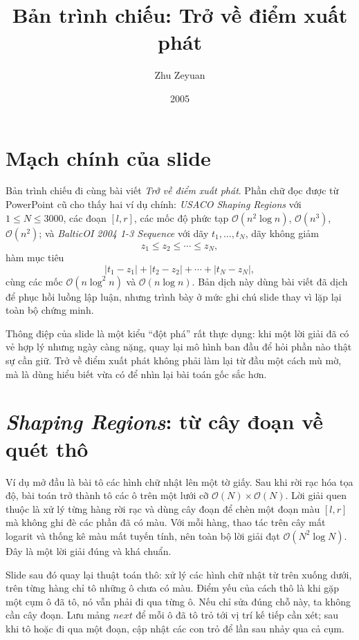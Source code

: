 \documentclass[11pt]{article}
\title{Bản trình chiếu: Trở về điểm xuất phát}
\author{Zhu Zeyuan}
\date{2005}
\newcommand{\Oh}{\mathcal{O}}
\begin{document}
\maketitle


\section{Mạch chính của slide}

Bản trình chiếu đi cùng bài viết \emph{Trở về điểm xuất phát}. Phần chữ đọc
được từ PowerPoint cũ cho thấy hai ví dụ chính: \textit{USACO Shaping
Regions} với \(1\le N\le 3000\), các đoạn \([l,r]\), các mốc độ phức tạp
\(\Oh(n^2\log n)\), \(\Oh(n^3)\), \(\Oh(n^2)\); và \textit{BalticOI 2004
1-3 Sequence} với dãy \(t_1,\ldots,t_N\), dãy không giảm
\[
  z_1\le z_2\le\cdots\le z_N,
\]
hàm mục tiêu
\[
  |t_1-z_1|+|t_2-z_2|+\cdots+|t_N-z_N|,
\]
cùng các mốc \(\Oh(n\log^2 n)\) và \(\Oh(n\log n)\). Bản dịch này dùng bài
viết đã dịch để phục hồi luồng lập luận, nhưng trình bày ở mức ghi chú slide
thay vì lặp lại toàn bộ chứng minh.

Thông điệp của slide là một kiểu ``đột phá'' rất thực dụng: khi một lời giải
đã có vẻ hợp lý nhưng ngày càng nặng, quay lại mô hình ban đầu để hỏi phần nào
thật sự cần giữ. Trở về điểm xuất phát không phải làm lại từ đầu một cách mù
mờ, mà là dùng hiểu biết vừa có để nhìn lại bài toán gốc sắc hơn.

\section{\textit{Shaping Regions}: từ cây đoạn về quét thô}

Ví dụ mở đầu là bài tô các hình chữ nhật lên một tờ giấy. Sau khi rời rạc hóa
tọa độ, bài toán trở thành tô các ô trên một lưới cỡ \(\Oh(N)\times\Oh(N)\).
Lời giải quen thuộc là xử lý từng hàng rời rạc và dùng cây đoạn để chèn một
đoạn màu \([l,r]\) mà không ghi đè các phần đã có màu. Với mỗi hàng, thao tác
trên cây mất logarit và thống kê màu mất tuyến tính, nên toàn bộ lời giải đạt
\(\Oh(N^2\log N)\). Đây là một lời giải đúng và khá chuẩn.

Slide sau đó quay lại thuật toán thô: xử lý các hình chữ nhật từ trên xuống
dưới, trên từng hàng chỉ tô những ô chưa có màu. Điểm yếu của cách thô là khi
gặp một cụm ô đã tô, nó vẫn phải đi qua từng ô. Nếu chỉ sửa đúng chỗ này, ta
không cần cây đoạn. Lưu mảng \(\mathit{next}\) để mỗi ô đã tô trỏ tới vị trí
kế tiếp cần xét; sau khi tô hoặc đi qua một đoạn, cập nhật các con trỏ để lần
sau nhảy qua cả cụm.
\end{document}

